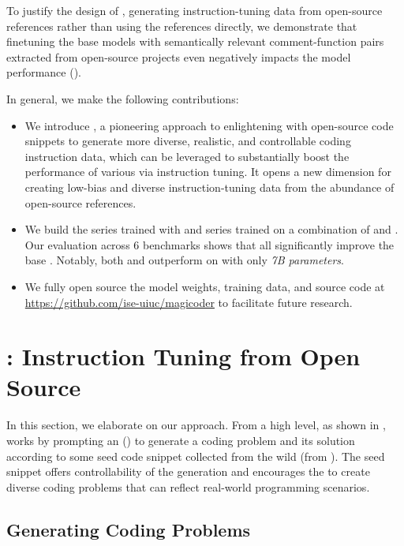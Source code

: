 To justify the design of \tech{}, \ie generating instruction-tuning data from open-source references rather than using the references directly, we demonstrate that finetuning the base models with semantically relevant comment-function pairs extracted from open-source projects even negatively impacts the model performance ().

In general, we make the following contributions:
\begin{itemize}

\item We introduce \tech, a pioneering approach to enlightening
 with open-source code snippets to generate more diverse, realistic, and controllable coding instruction data, which can be leveraged to substantially boost the performance of various  via instruction tuning.
It opens a new dimension for creating low-bias and diverse instruction-tuning data from the abundance of open-source references.

\item We build the \model{} series trained with \tech{} and \modelx{} series trained on a combination of \tech{} and \evolinstruct{}.
Our evaluation across 6 benchmarks shows that all  significantly improve the base .
Notably, both \modelxc{} and \modelxd{} outperform \chatgpt{} on \humanevalp{} with only \emph{7B parameters}.

\item We fully open source the model weights, training data, and source code 
at \url{https://github.com/ise-uiuc/magicoder}
to facilitate future research.

\end{itemize}

\section{\tech{}: Instruction Tuning from Open Source}
In this section, we elaborate on our \tech{} approach.
From a high level, as shown in , \tech{} works by prompting an \llm{} (\eg \chatgpt) to generate a coding problem and its solution according to some seed code snippet collected from the wild (\eg from \github).
The seed snippet offers controllability of the generation and encourages the \llm{} to create diverse coding problems that can reflect real-world programming scenarios.

\subsection{Generating Coding Problems}

